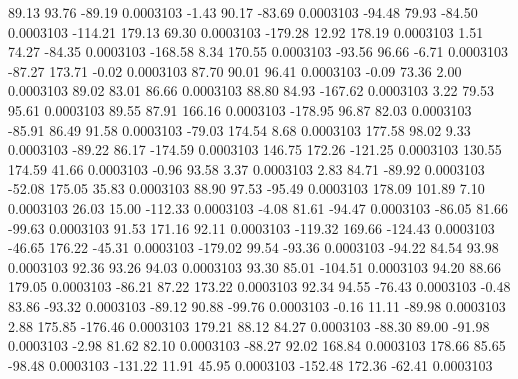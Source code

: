       89.13       93.76      -89.19     0.0003103
       -1.43       90.17      -83.69     0.0003103
      -94.48       79.93      -84.50     0.0003103
     -114.21      179.13       69.30     0.0003103
     -179.28       12.92      178.19     0.0003103
        1.51       74.27      -84.35     0.0003103
     -168.58        8.34      170.55     0.0003103
      -93.56       96.66       -6.71     0.0003103
      -87.27      173.71       -0.02     0.0003103
       87.70       90.01       96.41     0.0003103
       -0.09       73.36        2.00     0.0003103
       89.02       83.01       86.66     0.0003103
       88.80       84.93     -167.62     0.0003103
        3.22       79.53       95.61     0.0003103
       89.55       87.91      166.16     0.0003103
     -178.95       96.87       82.03     0.0003103
      -85.91       86.49       91.58     0.0003103
      -79.03      174.54        8.68     0.0003103
      177.58       98.02        9.33     0.0003103
      -89.22       86.17     -174.59     0.0003103
      146.75      172.26     -121.25     0.0003103
      130.55      174.59       41.66     0.0003103
       -0.96       93.58        3.37     0.0003103
        2.83       84.71      -89.92     0.0003103
      -52.08      175.05       35.83     0.0003103
       88.90       97.53      -95.49     0.0003103
      178.09      101.89        7.10     0.0003103
       26.03       15.00     -112.33     0.0003103
       -4.08       81.61      -94.47     0.0003103
      -86.05       81.66      -99.63     0.0003103
       91.53      171.16       92.11     0.0003103
     -119.32      169.66     -124.43     0.0003103
      -46.65      176.22      -45.31     0.0003103
     -179.02       99.54      -93.36     0.0003103
      -94.22       84.54       93.98     0.0003103
       92.36       93.26       94.03     0.0003103
       93.30       85.01     -104.51     0.0003103
       94.20       88.66      179.05     0.0003103
      -86.21       87.22      173.22     0.0003103
       92.34       94.55      -76.43     0.0003103
       -0.48       83.86      -93.32     0.0003103
      -89.12       90.88      -99.76     0.0003103
       -0.16       11.11      -89.98     0.0003103
        2.88      175.85     -176.46     0.0003103
      179.21       88.12       84.27     0.0003103
      -88.30       89.00      -91.98     0.0003103
       -2.98       81.62       82.10     0.0003103
      -88.27       92.02      168.84     0.0003103
      178.66       85.65      -98.48     0.0003103
     -131.22       11.91       45.95     0.0003103
     -152.48      172.36      -62.41     0.0003103

